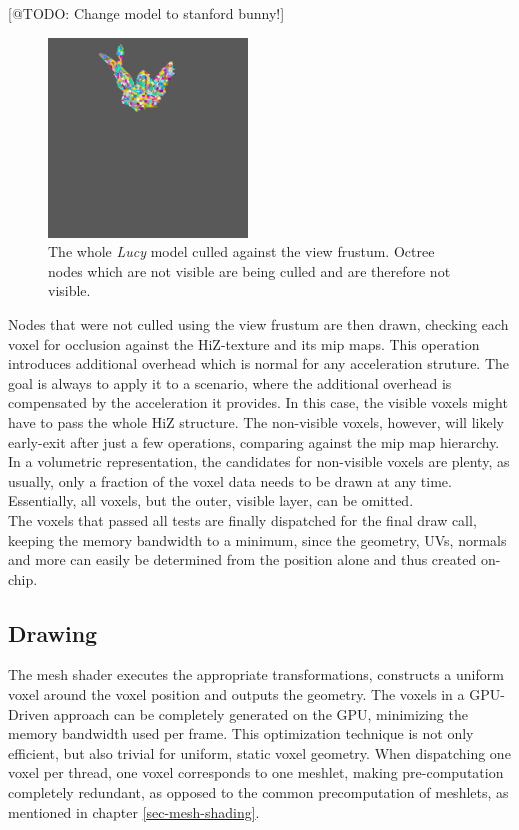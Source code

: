 [@TODO: Change model to stanford bunny!]
\begin{figure}[h]
    \centering
    \includegraphics[width=200px]{images/graphics/lucy-frustum-culling.jpg}
    \caption{The whole \emph{Lucy} model culled against the view frustum. Octree nodes which are not visible are being 
    culled and are therefore not visible.}
    \label{fig:lucy-frustum-culling}
\end{figure}

Nodes that were not culled using the view frustum are then drawn, checking each voxel for occlusion against the 
\ac{HiZ}-texture and its mip maps. This operation introduces additional overhead which is normal for any acceleration struture. 
The goal is always to apply it to a scenario, where the additional overhead is compensated by the acceleration it provides. 
In this case, the visible voxels might have to pass the whole \ac{HiZ} structure. The non-visible voxels, however, will likely 
early-exit after just a few operations, comparing against the mip map hierarchy. In a volumetric representation, the candidates 
for non-visible voxels are plenty, as usually, only a fraction of the voxel data needs to be drawn at any time. Essentially, 
all voxels, but the outer, visible layer, can be omitted.\\

\noindent
The voxels that passed all tests are finally dispatched for the final draw call, keeping the memory bandwidth to a minimum, 
since the geometry, UVs, normals and more can easily be determined from the position alone and thus created on-chip. \\

\subsection*{Drawing} \label{subsec-mesh-shader}

The mesh shader executes the appropriate transformations, constructs a uniform voxel around the voxel position 
and outputs the geometry. The voxels in a \ac{GPU}-Driven approach can be completely generated on the \ac{GPU}, 
minimizing the memory bandwidth used per frame. This optimization technique is not only efficient, but also 
trivial for uniform, static voxel geometry. When dispatching one voxel per thread, one voxel corresponds 
to one meshlet, making pre-computation completely redundant, as opposed to the common precomputation of meshlets, 
as mentioned in chapter \ref{sec-mesh-shading}.



